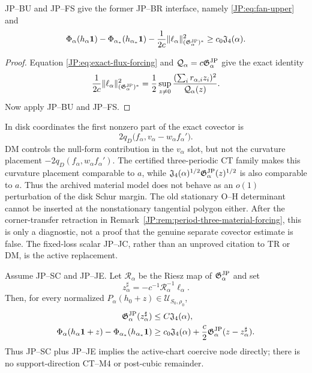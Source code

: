 \begin{proposition}
\label{JP:prop:BR-reduction}
JP--BU and JP--FS give the former JP--BR interface, namely
\eqref{JP:eq:fan-upper} and
\begin{equation}\label{JP:eq:BR}
 \Phi_\alpha(h_\alpha\mathbf1)
 -\Phi_{\alpha_*}(h_{\alpha_*}\mathbf1)
 -\frac1{2c}\|\ell_\alpha\|_{(\mathfrak G^{\rm JP}_\alpha)^*}^2
 \ge c_0\mathfrak J_4(\alpha).
\end{equation}
\end{proposition}

\begin{proof}
Equation \eqref{JP:eq:exact-flux-forcing} and
$\mathcal Q_\alpha=c\mathfrak G^{\rm JP}_\alpha$ give the exact identity
\[
 \frac1{2c}\|\ell_\alpha\|_{(\mathfrak G^{\rm JP}_\alpha)^*}^2
 =\frac12\sup_{z\ne0}
 \frac{(\sum_i r_{\alpha,i}z_i)^2}{\mathcal Q_\alpha(z)}.
\]
Now apply JP--BU and JP--FS.
\end{proof}

\begin{remark}
In disk coordinates the first nonzero part of the exact covector is
\[
 2q_D\bigl(f_\alpha,
       v_\alpha-w_\alpha f_\alpha'\bigr).
\]
DM controls the null-form contribution in the $v_\alpha$ slot, but not the
curvature placement $-2q_D(f_\alpha,w_\alpha f_\alpha')$.  The certified
three-periodic CT family makes this curvature placement comparable to
$a$, while
$\mathfrak J_4(\alpha)^{1/2}\mathfrak G^{\rm JP}_\alpha(z)^{1/2}$ is also comparable to $a$.
Thus the archived material model does not behave as an $o(1)$ perturbation
of the disk Schur margin.  The old stationary O--H determinant cannot be
inserted at the nonstationary tangential polygon either.  After the
corner-transfer retraction in
Remark~\ref{JP:rem:period-three-material-forcing}, this is only a diagnostic,
not a proof that the genuine separate covector estimate is false.  The
fixed-loss scalar JP--JC, rather than an unproved citation to TR or DM, is
the active replacement.
\end{remark}

\begin{theorem}
\label{JP:thm:completion}
Assume JP--SC and JP--JE.  Let $\mathcal R_\alpha$ be the Riesz map of
$\mathfrak G^{\rm JP}_\alpha$ and set
\begin{equation}\label{JP:eq:corrector}
 z_\alpha^\sharp=-c^{-1}\mathcal R_\alpha^{-1}\ell_\alpha.
\end{equation}
Then, for every normalized
$P_\alpha(h_0+z)\in\mathcal U_{S_0,\rho_0}$,
\begin{align}
 \mathfrak G^{\rm JP}_\alpha(z_\alpha^\sharp)&\le C\mathfrak J_4(\alpha),
 \label{JP:eq:corrector-bound}\\
 \Phi_\alpha(h_\alpha\mathbf1+z)
 -\Phi_{\alpha_*}(h_{\alpha_*}\mathbf1)
 &\ge c_0\mathfrak J_4(\alpha)
 +\frac c2\mathfrak G^{\rm JP}_\alpha(z-z_\alpha^\sharp).
 \label{JP:eq:joint-gap}
\end{align}
Thus JP--SC plus JP--JE implies the active-chart coercive node directly;
there is no support-direction CT--M4 or post-cubic remainder.
\end{theorem}

